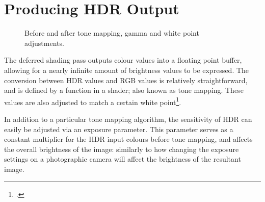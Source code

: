 \documentclass[11pt, oneside]{report}
\begin{document}
\section{Producing HDR Output}
\begin{figure}[!htbp]
  \centering
  \hfill
  \caption{Before and after \gls{tone mapping}, gamma and white point adjustments.}
\end{figure}

The deferred shading pass outputs colour values into a \gls{floating point} buffer, allowing for a nearly infinite amount of brightness values to be expressed. The conversion between HDR values and \gls{RGB} values is relatively straightforward, and is defined by a function in a \gls{shader}; also known as \gls{tone mapping}. These values are also adjusted to match a certain \gls{white point}\footcite{hdr}.

In addition to a particular \gls{tone mapping} algorithm, the sensitivity of \gls{HDR} can easily be adjusted via an exposure parameter. This parameter serves as a constant multiplier for the \gls{HDR} input colours before \gls{tone mapping}, and affects the overall brightness of the image: similarly to how changing the exposure settings on a photographic camera will affect the brightness of the resultant image.
\end{document}
